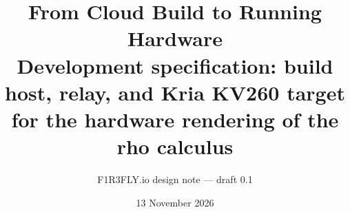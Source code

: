 \documentclass[11pt]{article}
\title{From Cloud Build to Running Hardware\\[4pt]
\large Development specification: build host, relay, and Kria KV260 target\\
for the hardware rendering of the rho calculus}
\author{F1R3FLY.io design note --- draft 0.1}
\date{13 November 2026}
\theoremstyle{definition}
\begin{document}
\maketitle
\begin{abstract}
\noindent

\end{abstract}
\tableofcontents

\end{document}
